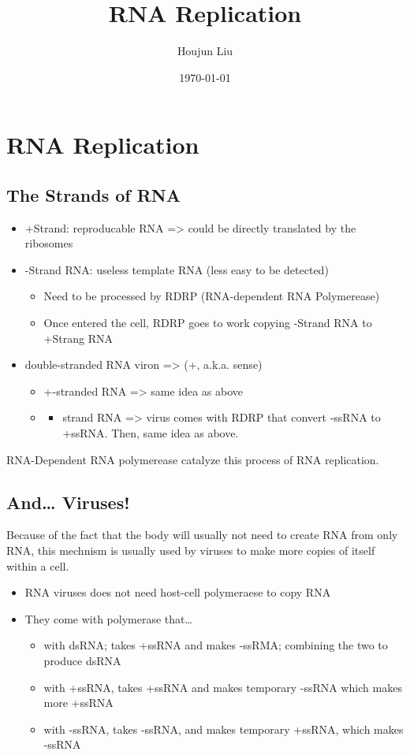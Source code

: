 \documentclass[letterpaper]{article}
\author{Houjun Liu}
\date{\today}
\title{RNA Replication}
\renewcommand{\tableofcontents}{}
\begin{document}
\tableofcontents



\section{RNA Replication}
\label{sec:org9aae128}
\subsection{The Strands of RNA}
\label{sec:orgb7460cb}
\begin{itemize}
\item +Strand: reproducable RNA => could be directly translated by the
ribosomes
\item -Strand RNA: useless template RNA (less easy to be detected)

\begin{itemize}
\item Need to be processed by RDRP (RNA-dependent RNA Polymerease)
\item Once entered the cell, RDRP goes to work copying -Strand RNA to
+Strang RNA
\end{itemize}

\item double-stranded RNA viron => (+, a.k.a. sense)

\begin{itemize}
\item +-stranded RNA => same idea as above

\item \begin{itemize}
\item strand RNA => virus comes with RDRP that convert -ssRNA to +ssRNA.
Then, same idea as above.
\end{itemize}
\end{itemize}
\end{itemize}

RNA-Dependent RNA polymerease catalyze this process of RNA replication.

\subsection{And\ldots{} Viruses!}
\label{sec:org23dfd90}
Because of the fact that the body will usually not need to create RNA
from only RNA, this mechnism is usually used by viruses to make more
copies of itself within a cell.

\begin{itemize}
\item RNA viruses does not need host-cell polymeraese to copy RNA
\item They come with polymerase that\ldots{}

\begin{itemize}
\item with dsRNA; takes +ssRNA and makes -ssRMA; combining the two to
produce dsRNA
\item with +ssRNA, takes +ssRNA and makes temporary -ssRNA which makes
more +ssRNA
\item with -ssRNA, takes -ssRNA, and makes temporary +ssRNA, which makes
-ssRNA
\end{itemize}
\end{itemize}
\end{document}
